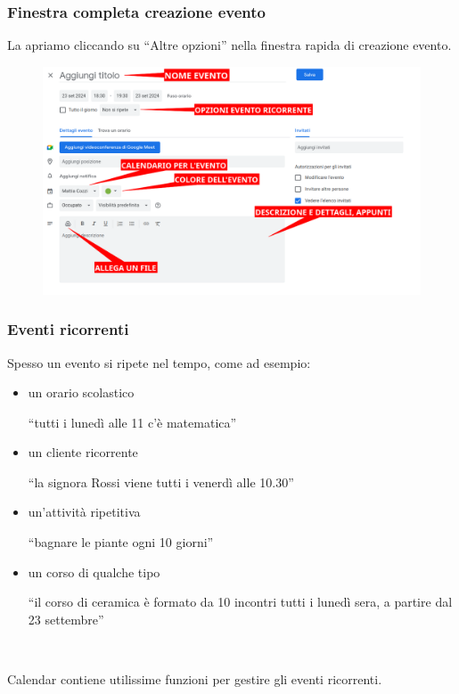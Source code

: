 \documentclass[]{beamer}
\begin{document}
\begin{frame}
\frametitle{Finestra completa creazione evento}
La apriamo cliccando su ``Altre opzioni'' nella finestra rapida di creazione evento.

\begin{figure}
  \includegraphics[width=\columnwidth]{img/calendarevento.png}
\end{figure}
\end{frame}

\begin{frame}
\frametitle{Eventi ricorrenti}
Spesso un evento si ripete nel tempo, come ad esempio:
\begin{itemize}
  \item un orario scolastico \begin{center}``tutti i lunedì alle 11 c'è matematica''\end{center}\pause
  \item un cliente ricorrente \begin{center}``la signora Rossi viene tutti i venerdì alle 10.30''\end{center}\pause
  \item un'attività ripetitiva \begin{center}``bagnare le piante ogni 10 giorni''\end{center}\pause
  \item un corso di qualche tipo \begin{center}``il corso di ceramica è  formato da 10 incontri tutti i lunedì sera, a partire dal 23 settembre''\end{center}\pause
\end{itemize}

~

Calendar contiene utilissime funzioni per gestire gli eventi ricorrenti.
\end{frame}
\end{document}
